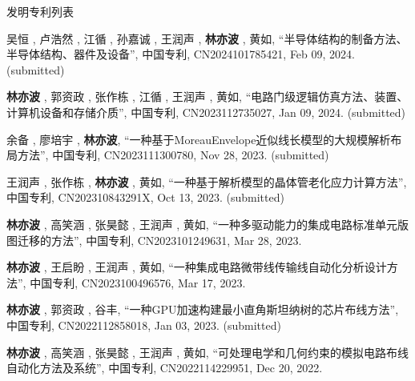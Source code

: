 \begin{rSection}{发明专利列表}



\begin{description}[font=\normalfont, rightmargin=2em]
    

\item[{[P18]}]{
        吴恒 ,  卢浩然 ,  江循 ,  孙嘉诚 ,  王润声 ,  \textbf{林亦波} ,  黄如, 
    ``半导体结构的制备方法、半导体结构、器件及设备'', 
    中国专利, CN2024101785421, Feb 09, 2024.
    (submitted)
}
            

\item[{[P17]}]{
        \textbf{林亦波} ,  郭资政 ,  张作栋 ,  江循 ,  王润声 ,  黄如, 
    ``电路门级逻辑仿真方法、装置、计算机设备和存储介质'', 
    中国专利, CN2023112735027, Jan 09, 2024.
    (submitted)
}
            

\item[{[P16]}]{
        余备 ,  廖培宇 ,  \textbf{林亦波}, 
    ``一种基于MoreauEnvelope近似线长模型的大规模解析布局方法'', 
    中国专利, CN2023111300780, Nov 28, 2023.
    (submitted)
}
            

\item[{[P15]}]{
        王润声 ,  张作栋 ,  \textbf{林亦波} ,  黄如, 
    ``一种基于解析模型的晶体管老化应力计算方法'', 
    中国专利, CN202310843291X, Oct 13, 2023.
    (submitted)
}
            

\item[{[P14]}]{
        \textbf{林亦波} ,  高笑涵 ,  张昊懿 ,  王润声 ,  黄如, 
    ``一种多驱动能力的集成电路标准单元版图迁移的方法'', 
    中国专利, CN2023101249631, Mar 28, 2023.
    
}
            

\item[{[P13]}]{
        \textbf{林亦波} ,  王启盼 ,  王润声 ,  黄如, 
    ``一种集成电路微带线传输线自动化分析设计方法'', 
    中国专利, CN2023100496576, Mar 17, 2023.
    
}
            

\item[{[P12]}]{
        \textbf{林亦波} ,  郭资政 ,  谷丰, 
    ``一种GPU加速构建最小直角斯坦纳树的芯片布线方法'', 
    中国专利, CN2022112858018, Jan 03, 2023.
    (submitted)
}
            

\item[{[P11]}]{
        \textbf{林亦波} ,  高笑涵 ,  张昊懿 ,  王润声 ,  黄如, 
    ``可处理电学和几何约束的模拟电路布线自动化方法及系统'', 
    中国专利, CN2022114229951, Dec 20, 2022.
    
}
\end{description}
\end{rSection}
